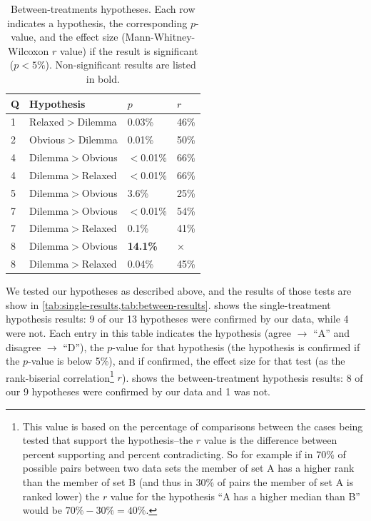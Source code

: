 \begin{table}[!hp]
\centering
\bgroup
\def\arraystretch{1.1}
\setlength{\tabcolsep}{0.7em}
\begin{tabular}{p{0.3em} | p{8em} | p{2.8em} | p{1.4em} |}
Q & Hypothesis & $p$ & $r$ \\
\hline
1  & Relaxed$>$Dilemma & 0.03\% & 46\% \\
\hline
2  & Obvious$>$Dilemma & 0.01\% & 50\% \\
\hline
4  & Dilemma$>$Obvious & $<$0.01\% & 66\% \\
\hline
4  & Dilemma$>$Relaxed & $<$0.01\% & 66\% \\
\hline
5  & Dilemma$>$Obvious & 3.6\% & 25\% \\
\hline
7  & Dilemma$>$Obvious & $<$0.01\% & 54\% \\
\hline
7  & Dilemma$>$Relaxed & 0.1\% & 41\% \\
\hline
8  & Dilemma$>$Obvious & \textbf{14.1\%} & $\times$ \\
\hline
8  & Dilemma$>$Relaxed & 0.04\% & 45\% \\
\hline
\end{tabular}
\egroup
  \caption{Between-treatments hypotheses. Each row indicates a hypothesis, the corresponding $p$-value, and the effect size (Mann-Whitney-Wilcoxon $r$ value) if the result is significant ($p < 5\%$). Non-significant results are listed in bold.}
  \label{tab:between-results}
\end{table}


We tested our hypotheses as described above, and the results of those tests are show in \cref{tab:single-results,tab:between-results}.
%
 shows the single-treatment hypothesis results: 9 of our 13 hypotheses were confirmed by our data, while 4 were not.
%
Each entry in this table indicates the hypothesis (agree $\rightarrow$ ``A'' and disagree $\rightarrow$ ``D''), the $p$-value for that hypothesis (the hypothesis is confirmed if the $p$-value is below 5\%), and if confirmed, the effect size for that test (as the rank-biserial correlation\footnote{This value is based on the percentage of comparisons between the cases being tested that support the hypothesis--the $r$ value is the difference between percent supporting and percent contradicting. So for example if in 70\% of possible pairs between two data sets the member of set A has a higher rank than the member of set B (and thus in 30\% of pairs the member of set A is ranked lower) the $r$ value for the hypothesis ``A has a higher median than B'' would be $70\% - 30\% = 40\%$.} $r$).
%
 shows the between-treatment hypothesis results: 8 of our 9 hypotheses were confirmed by our data and 1 was not.


